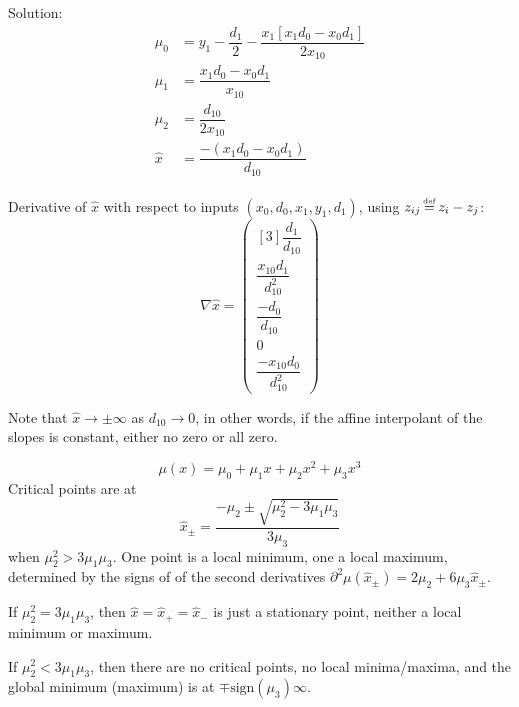 Solution:
\begin{align}
\mu_0 & = 
y_1 
- 
\dfrac{d_1}{2}
-
\dfrac{x_1 \left[x_1 d_0 - x_0 d_1 \right]}{2 x_{10}}
\\
\mu_1 & =
\dfrac{x_1 d_0 - x_0 d_1}{x_{10}}
\nonumber
\\
\mu_2 & = \dfrac{d_{10}}{2 x_{10}}
\nonumber
\\
\hat{x} & = \dfrac{- \left( x_1 d_0 - x_0 d_1 \right)}{d_{10}}
\nonumber
\end{align}

Derivative of $\hat{x}$ with respect to inputs
$(x_0,d_0,x_1,y_1,d_1)$,
using $z_{ij} \operatorname*{\overset{\underset{\mathrm{def}}{}}{=}} z_i - z_j$:
\begin{equation}
\nabla \hat{x} =
\begin{pmatrix}[3]
\dfrac{d_1}{d_{10}}
\\
\dfrac{ x_{10} d_1}{d_{10}^{2}}
\\
\dfrac{- d_0}{d_{10}}
\\
0
\\
\dfrac{- x_{10} d_0}{d_{10}^{2}
}
\end{pmatrix}
\end{equation}
 
Note that $\hat{x} \to \pm \infty$ as $d_{10} \to 0$,
in other words,
if the affine interpolant of the slopes is constant,
either no zero or all zero.

% 

% 

\pagebreak
{}

\begin{equation}
\mu(x) = \mu_0 + \mu_1 x + \mu_2 x^2 + \mu_3 x^3
\end{equation}
Critical points are at
\begin{equation}
\hat{x}_{\pm} = \frac{-\mu_2 \pm \sqrt{ \mu_2^{2} - 3 \mu_1 \mu_3 }}{3 \mu_3}
\end{equation}
when $\mu_2^{2} > 3 \mu_1 \mu_3$.
One point is a local minimum, one a local maximum, 
determined by the signs of of the second derivatives
$\partial^2\mu(\hat{x}_{\pm}) = 2 \mu_2 + 6 \mu_3 \hat{x}_{\pm}$.

If $\mu_2^{2} = 3 \mu_1 \mu_3$, 
then $\hat{x} = \hat{x}_{+} = \hat{x}_{-}$ is just a stationary
point, neither a local minimum or maximum.

If $\mu_2^{2} < 3 \mu_1 \mu_3$, then there are no critical points,
no local minima/maxima, and the global minimum (maximum) is at
$\mp\text{sign}(\mu_3)\infty$.

